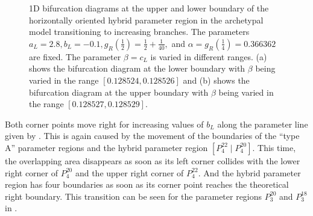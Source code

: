 \begin{figure}
	\centering
	\caption[1D bifurcation diagrams at the upper and lower boundary of the horizontally oriented hybrid parameter region in the archetypal model transitioning to increasing branches]{
		1D bifurcation diagrams at the upper and lower boundary of the horizontally oriented hybrid parameter region in the archetypal model transitioning to increasing branches.
		The parameters $a_L = 2.8, b_L = -0.1, g_R\left(\frac{1}{2}\right) = \frac{1}{2} + \frac{1}{40},$ and $\alpha = g_R\left(\frac{1}{4}\right) = 0.366362$ are fixed.
		The parameter $\beta = c_L$ is varied in different ranges.
		(a) shows the bifurcation diagram at the lower boundary with $\beta$ being varied in the range $[0.128524, 0.128526]$
		and (b) shows the bifurcation diagram at the upper boundary with $\beta$ being varied in the range $[0.128527, 0.128529]$.
	}
	\label{fig:add.change.appa.hor.bif}
\end{figure}

Both corner points move right for increasing values of $b_L$ along the parameter line given by .
This is again caused by the movement of the boundaries of the ``type A'' parameter regions and the hybrid parameter region $\left[P^{22}_4 \mid P^{20}_4\right]$.
This time, the overlapping area disappears as soon as its left corner collides with the lower right corner of $P^{20}_4$ and the upper right corner of $P^{22}_4$.
And the hybrid parameter region has four boundaries as soon as its corner point reaches the theoretical right boundary.
This transition can be seen for the parameter regions $P^{20}_3$ and $P^{18}_3$ in .

